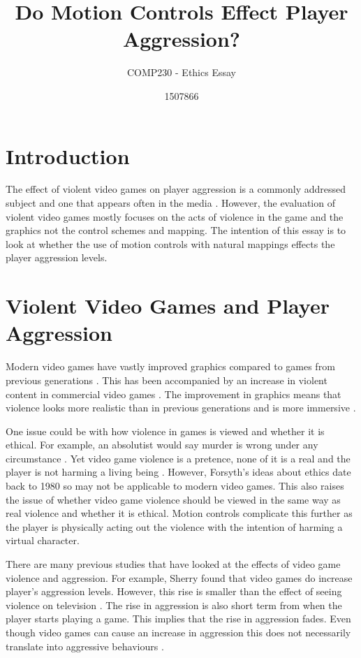 \documentclass{scrartcl}
\title{ Do Motion Controls Effect Player Aggression?}
\subtitle{COMP230 - Ethics Essay}
\author{1507866}
\begin{document}
	
\maketitle
	
	
\section{Introduction}
The effect of violent video games on player aggression is a commonly addressed subject and one that appears often in the media \cite{DailyMail, GuardianAggression, CBSNews}.
However, the evaluation of violent video games mostly focuses on the acts of violence in the game and the graphics not the control schemes and mapping. 
The intention of this essay is to look at whether the use of motion controls with natural mappings effects the player aggression levels.

\section{Violent Video Games and Player Aggression} 
Modern video games have vastly improved graphics compared to games from previous generations  \cite{Fumhe}.  This has been accompanied by an increase in violent content in commercial video games \cite{Fumhe}. The improvement in graphics means that violence looks more realistic than in previous generations and is more immersive \cite{Kim}.

\bigskip
One issue could be with how violence in games is viewed and whether it is ethical. For example, an absolutist would say murder is wrong under any circumstance \cite{forsyth}. 
Yet video game violence is a pretence, none of it is a real and the player is not harming a living being \cite{Tavinor}. 
However, Forsyth's ideas about ethics date back to 1980 so may not be applicable to modern video games. 
This also raises the issue of whether video game violence should be viewed in the same way as real violence and whether it is ethical. 
Motion controls complicate this further as the player is physically acting out the violence with the intention of harming a virtual character. 

\bigskip
There are many previous studies that have looked at the effects of video game violence and aggression.  For example, Sherry found that video games do increase player's aggression levels.  However, this rise is smaller than the effect of seeing violence on television  \cite{sherry2001effects}.
The rise in aggression is also short term from when the player starts playing a game.  This implies that the rise in aggression fades.  Even though video games can cause an increase in aggression this does not necessarily translate into aggressive behaviours \cite{Ferguson}.
\end{document}
